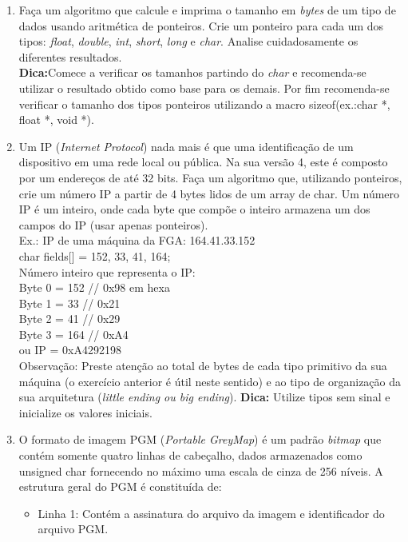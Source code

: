 \documentclass[a4paper,10pt]{article}
\begin{document}
\begin{enumerate}
 \item Faça um algoritmo que calcule e imprima o tamanho em \emph{bytes} de um tipo de dados usando aritmética de ponteiros. Crie um ponteiro para cada 
      um dos tipos: \emph{float}, \emph{double}, \emph{int}, \emph{short}, \emph{long} e \emph{char}. Analise cuidadosamente os diferentes resultados.\\
      \textbf{Dica:}Comece a verificar os tamanhos partindo do \emph{char} e recomenda-se utilizar o resultado obtido como base para os demais. Por fim 
	recomenda-se verificar o tamanho dos tipos ponteiros utilizando a macro sizeof(ex.:char *, float *, void *).
 \item Um IP (\emph{Internet Protocol}) nada mais é que uma identificação de um dispositivo em uma rede local ou pública. Na sua versão 4, este é composto 
      por um endereços de até 32 bits. Faça um algoritmo que, utilizando ponteiros, crie um número IP a partir de 4 bytes lidos de um array de char. 
      Um número IP é um inteiro, onde cada byte que compõe o inteiro armazena um dos campos do IP (usar apenas ponteiros).\\
      Ex.: IP de uma máquina da FGA: 164.41.33.152\\
	  char fields[] = {152, 33, 41, 164};\\
	  Número inteiro que representa o IP:\\
	  Byte 0 = 152 // 0x98 em hexa\\
	  Byte 1 = 33 // 0x21\\
	  Byte 2 = 41 // 0x29\\
	  Byte 3 = 164 // 0xA4\\
	  ou IP = 0xA4292198\\
      Observação: Preste atenção ao total de bytes de cada tipo primitivo da sua máquina (o exercício anterior é útil neste sentido) e ao tipo de 
      organização da sua arquitetura (\emph{little ending ou big ending}).
      \textbf{Dica:} Utilize tipos sem sinal e inicialize os valores iniciais. 
 \item O formato de imagem PGM (\emph{Portable GreyMap}) é um padrão \emph{bitmap} que contém somente quatro linhas de cabeçalho, dados armazenados como unsigned 
      char fornecendo no máximo uma escala de cinza de 256 níveis. A estrutura geral do PGM é constituída de:\\
      \begin{itemize}
       \item Linha 1: Contém a assinatura do arquivo da imagem e identificador do arquivo PGM.

\end{itemize}
\end{enumerate}
\end{document}
